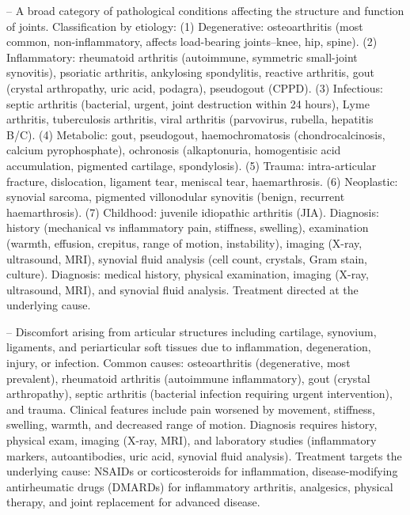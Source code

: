 -- A broad category of pathological conditions affecting the structure and function of joints. Classification by etiology: (1) Degenerative: osteoarthritis (most common, non-inflammatory, affects load-bearing joints--knee, hip, spine). (2) Inflammatory: rheumatoid arthritis (autoimmune, symmetric small-joint synovitis), psoriatic arthritis, ankylosing spondylitis, reactive arthritis, gout (crystal arthropathy, uric acid, podagra), pseudogout (CPPD). (3) Infectious: septic arthritis (bacterial, urgent, joint destruction within 24 hours), Lyme arthritis, tuberculosis arthritis, viral arthritis (parvovirus, rubella, hepatitis B/C). (4) Metabolic: gout, pseudogout, haemochromatosis (chondrocalcinosis, calcium pyrophosphate), ochronosis (alkaptonuria, homogentisic acid accumulation, pigmented cartilage, spondylosis). (5) Trauma: intra-articular fracture, dislocation, ligament tear, meniscal tear, haemarthrosis. (6) Neoplastic: synovial sarcoma, pigmented villonodular synovitis (benign, recurrent haemarthrosis). (7) Childhood: juvenile idiopathic arthritis (JIA). Diagnosis: history (mechanical vs inflammatory pain, stiffness, swelling), examination (warmth, effusion, crepitus, range of motion, instability), imaging (X-ray, ultrasound, MRI), synovial fluid analysis (cell count, crystals, Gram stain, culture). Diagnosis: medical history, physical examination, imaging (X-ray, ultrasound, MRI), and synovial fluid analysis. Treatment directed at the underlying cause.

-- Discomfort arising from articular structures including cartilage, synovium, ligaments, and periarticular soft tissues due to inflammation, degeneration, injury, or infection. Common causes: osteoarthritis (degenerative, most prevalent), rheumatoid arthritis (autoimmune inflammatory), gout (crystal arthropathy), septic arthritis (bacterial infection requiring urgent intervention), and trauma. Clinical features include pain worsened by movement, stiffness, swelling, warmth, and decreased range of motion. Diagnosis requires history, physical exam, imaging (X-ray, MRI), and laboratory studies (inflammatory markers, autoantibodies, uric acid, synovial fluid analysis). Treatment targets the underlying cause: NSAIDs or corticosteroids for inflammation, disease-modifying antirheumatic drugs (DMARDs) for inflammatory arthritis, analgesics, physical therapy, and joint replacement for advanced disease.

